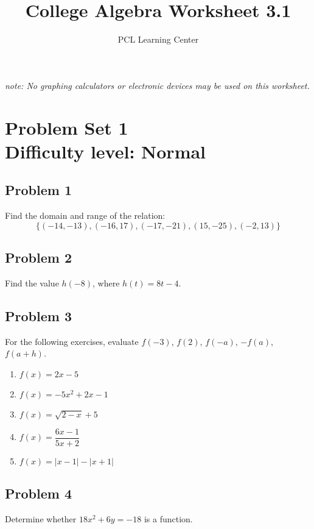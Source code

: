 \documentclass[12pt]{article}
\title{College Algebra Worksheet 3.1}
\author{PCL Learning Center}
\date{}
\begin{document}
\maketitle

\begin{center}
    \textit{note: No graphing calculators or electronic devices may be used on this worksheet.}    
\end{center}

\section*{Problem Set 1\\Difficulty level: Normal}
\subsection*{Problem 1}
Find the domain and range of the relation:
\[
\{(-14, -13), (-16, 17), (-17, -21), (15, -25), (-2, 13)\}
\]

\subsection*{Problem 2}
Find the value \( h(-8) \), where \( h(t) = 8t - 4 \).

\subsection*{Problem 3}
For the following exercises, evaluate \( f(-3) \), \( f(2) \), \( f(-a) \), \( -f(a) \), \( f(a+h) \).
    \begin{enumerate}
        \item \( f(x) = 2x - 5 \)
        \item \( f(x) = -5x^2 + 2x - 1 \)
        \item \( f(x) = \sqrt{2-x} + 5 \)
        \item \( f(x) = \dfrac{6x-1}{5x+2} \)
        \item \( f(x) = |x-1| - |x+1| \)
    \end{enumerate}


\subsection*{Problem 4}
Determine whether \(18x^2+6y=-18\) is a function.
\end{document}
